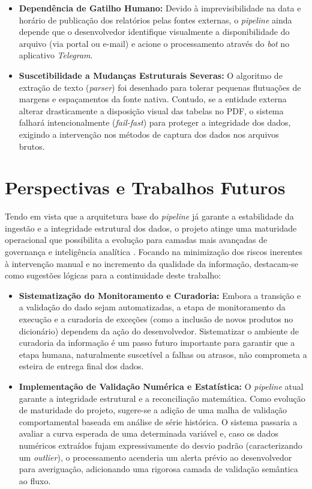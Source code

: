 \begin{itemize}
    \item \textbf{Dependência de Gatilho Humano:} Devido à imprevisibilidade na data e horário de publicação dos relatórios pelas fontes externas, o \textit{pipeline} ainda depende que o desenvolvedor identifique visualmente a disponibilidade do arquivo (via portal ou e-mail) e acione o processamento através do \textit{bot} no aplicativo \textit{Telegram}.
    \item \textbf{Suscetibilidade a Mudanças Estruturais Severas:} O algoritmo de extração de texto (\textit{parser}) foi desenhado para tolerar pequenas flutuações de margens e espaçamentos da fonte nativa. Contudo, se a entidade externa alterar drasticamente a disposição visual das tabelas no PDF, o sistema falhará intencionalmente (\textit{fail-fast}) para proteger a integridade dos dados, exigindo a intervenção nos métodos de captura dos dados nos arquivos brutos.
\end{itemize}

\section{Perspectivas e Trabalhos Futuros}

Tendo em vista que a arquitetura base do \textit{pipeline} já garante a estabilidade da ingestão e a integridade estrutural dos dados, o projeto atinge uma maturidade operacional que possibilita a evolução para camadas mais avançadas de governança e inteligência analítica \cite{gujjala_medallion}. Focando na minimização dos riscos inerentes à intervenção manual e no incremento da qualidade da informação, destacam-se como sugestões lógicas para a continuidade deste trabalho:

\begin{itemize}
    \item \textbf{Sistematização do Monitoramento e Curadoria:} Embora a transição e a validação do dado sejam automatizadas, a etapa de monitoramento da execução e a curadoria de exceções (como a inclusão de novos produtos no dicionário) dependem da ação do desenvolvedor. Sistematizar o ambiente de curadoria da informação é um passo futuro importante para garantir que a etapa humana, naturalmente suscetível a falhas ou atrasos, não comprometa a esteira de entrega final dos dados.
    \item \textbf{Implementação de Validação Numérica e Estatística:} O \textit{pipeline} atual garante a integridade estrutural e a reconciliação matemática. Como evolução de maturidade do projeto, sugere-se a adição de uma malha de validação comportamental baseada em análise de série histórica. O sistema passaria a avaliar a curva esperada de uma determinada variável e, caso os dados numéricos extraídos fujam expressivamente do desvio padrão (caracterizando um \textit{outlier}), o processamento acenderia um alerta prévio ao desenvolvedor para averiguação, adicionando uma rigorosa camada de validação semântica ao fluxo.
\end{itemize}

